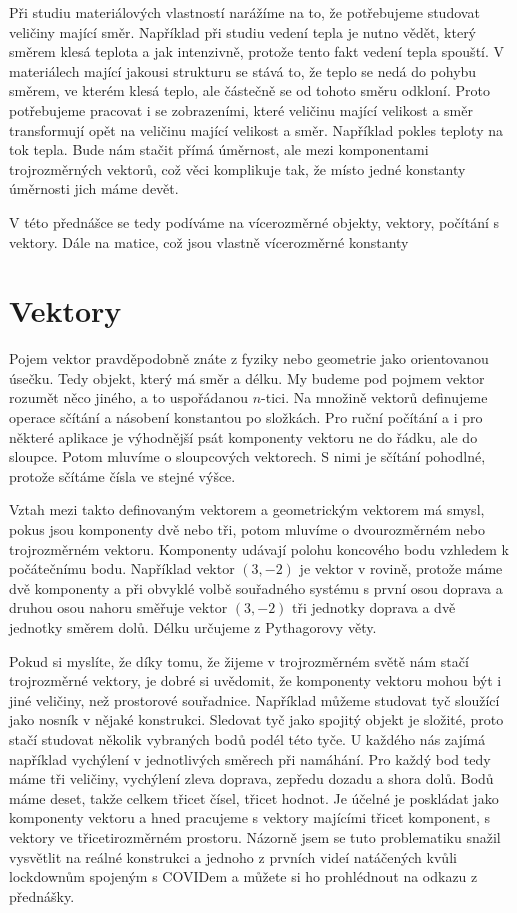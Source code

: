 \documentclass[12pt]{article}
\begin{document}
Při studiu materiálových vlastností narážíme na to, že potřebujeme studovat veličiny mající směr. Například při studiu vedení tepla je nutno vědět, který směrem klesá teplota a jak intenzivně, protože tento fakt vedení tepla spouští. V materiálech mající jakousi strukturu se stává to, že teplo se nedá do pohybu směrem, ve kterém klesá teplo, ale částečně se od tohoto směru odkloní. Proto potřebujeme pracovat i se zobrazeními, které veličinu mající velikost a směr transformují opět na veličinu mající velikost a směr. Například pokles teploty na tok tepla. Bude nám stačit přímá úměrnost, ale mezi komponentami trojrozměrných vektorů, což věci komplikuje tak, že místo jedné konstanty úměrnosti jich máme devět.

V této přednášce se tedy podíváme na vícerozměrné objekty, vektory, počítání s vektory. Dále na matice, což jsou vlastně vícerozměrné konstanty 

\section*{Vektory}

Pojem vektor pravděpodobně znáte z fyziky nebo geometrie jako orientovanou úsečku. Tedy objekt, který má směr a délku. My budeme pod pojmem vektor rozumět něco jiného, a to uspořádanou $n$-tici. Na množině vektorů definujeme operace sčítání a násobení konstantou po složkách. Pro ruční počítání a i pro některé aplikace je  výhodnější psát komponenty vektoru ne do řádku, ale do sloupce. Potom mluvíme o sloupcových vektorech. S nimi je sčítání pohodlné, protože sčítáme čísla ve stejné výšce.

Vztah mezi takto definovaným vektorem a geometrickým vektorem má smysl, pokus jsou komponenty dvě nebo tři, potom mluvíme o dvourozměrném nebo trojrozměrném vektoru. Komponenty udávají polohu koncového bodu vzhledem k počátečnímu bodu. Například vektor $(3,-2)$ je vektor v rovině, protože máme dvě komponenty a při obvyklé volbě souřadného systému s první osou doprava a druhou osou nahoru směřuje vektor $(3,-2)$ tři jednotky doprava a dvě jednotky směrem dolů. Délku určujeme z Pythagorovy věty. 

Pokud si myslíte, že díky tomu, že žijeme v trojrozměrném světě nám stačí trojrozměrné vektory, je dobré si uvědomit, že komponenty vektoru mohou být i jiné veličiny, než prostorové souřadnice. Například můžeme studovat tyč sloužící jako nosník v nějaké konstrukci. Sledovat tyč jako spojitý objekt je složité, proto stačí studovat několik vybraných bodů podél této tyče. U každého nás zajímá například vychýlení v jednotlivých směrech při namáhání. Pro každý bod tedy máme tři veličiny, vychýlení zleva doprava, zepředu dozadu a shora dolů. Bodů máme deset, takže celkem třicet čísel, třicet hodnot. Je účelné je poskládat jako komponenty vektoru a hned pracujeme s vektory majícími třicet komponent, s vektory ve třicetirozměrném prostoru. Názorně jsem se tuto problematiku snažil vysvětlit na reálné konstrukci a jednoho z prvních videí natáčených kvůli lockdownům spojeným s COVIDem a můžete si ho prohlédnout na odkazu z přednášky. 
\end{document}
